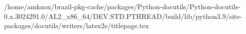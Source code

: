/home/amknox/brazil-pkg-cache/packages/Python-docutils/Python-docutils-0.x.3024291.0/AL2_x86_64/DEV.STD.PTHREAD/build/lib/python3.9/site-packages/docutils/writers/latex2e/titlepage.tex